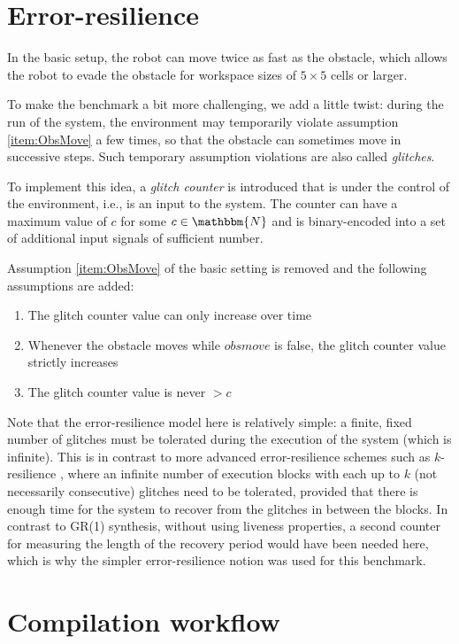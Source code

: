 \documentclass[a4paper,conference,10pt]{IEEEtran}
\newcommand{\NN}{\mathbbm{N}}
\begin{document}
\section{Error-resilience}

In the basic setup, the robot can move twice as fast as the obstacle, which allows the robot to evade the obstacle for workspace sizes of $5 \times 5$ cells or larger.

To make the benchmark a bit more challenging, we add a little twist: during the run of the system, the environment may temporarily violate assumption \ref{item:ObsMove} a few times, so that the obstacle can sometimes move in successive steps. Such temporary assumption violations are also called \emph{glitches}.

To implement this idea, a \emph{glitch counter} is introduced that is under the control of the environment, i.e., is an input to the system. The counter can have a maximum value of $c$ for some $c \in \NN$ and is binary-encoded into a set of additional input signals of sufficient number. 

Assumption \ref{item:ObsMove} of the basic setting is removed and the following assumptions are added:
\begin{enumerate}
\item The glitch counter value can only increase over time
\item Whenever the obstacle moves while $\mathit{obsmove}$ is false, the glitch counter value strictly increases
\item The glitch counter value is never $> c$
\end{enumerate}

Note that the error-resilience model here is relatively simple: a finite, fixed number of glitches must be tolerated during the execution of the system (which is infinite). 
This is in contrast to more advanced error-resilience schemes such as $k$-resilience \cite{DBLP:journals/corr/abs-1210-2449,EhlersTopcuHSCC2014}, where an infinite number of execution blocks with each up to $k$ (not necessarily consecutive) glitches need to be tolerated, provided that there is enough time for the system to recover from the glitches in between the blocks. In contrast to GR(1) synthesis, without using liveness properties, a second counter for measuring the length of the recovery period would have been needed here, which is why the simpler error-resilience notion was used for this benchmark.

\section{Compilation workflow}
\end{document}
